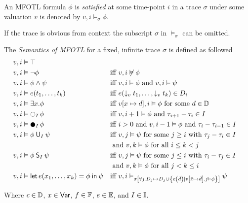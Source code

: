 \begin{definition}
    \label{def:mfotl-satisfaction}
    An MFOTL formula $\phi$ is \emph{satisfied} at some time-point $i$ in
    a trace $\sigma$ under
    some valuation $v$ is denoted by $v,i \vDash_\sigma \phi $.
\end{definition}
If the trace is obvious from context the subscript $\sigma$ in $\vDash_\sigma$ can be
omitted.
\begin{definition}
    \label{def:mfotl-semantics}
    The \emph{Semantics of MFOTL} for a fixed, infinite trace $\sigma$ is defined as followed
    \begin{align*}
        v, i &\vDash  \top \\
        v, i &\vDash  \neg \phi
            &&\text{iff } v, i \not\vDash  \phi \\
        v, i &\vDash  \phi \wedge \psi
            &&\text{iff } v, i \vDash  \phi \text{ and } v, i \vDash  \psi \\
        v, i &\vDash  e(t_1, \dots, t_k)
            &&\text{iff } e(\downarrow_v t_1, \dots, \downarrow_v t_k) \in D_i \\
        v, i &\vDash  \exists x. \phi
            &&\text{iff } v[x \mapsto d], i \vDash  \phi \text{ for some } d \in \Domain \\
        v, i &\vDash  \Next_I \phi
            &&\text{iff } v, i+1 \vDash  \phi \text{ and } \tau_{i+1} - \tau_i \in I \\
        v, i &\vDash  \Prev_I \phi
            &&\text{iff } i>0 \text{ and } v, i-1 \vDash  \phi
            \text{ and } \tau_i - \tau_{i-1} \in I \\
        v, i &\vDash  \phi \UUntil_I \psi
            &&\text{iff } v, j \vDash  \psi \text{ for some } j \geq i
            \text{ with } \tau_j - \tau_i \in I \\
            &&&
            \text{ and } v, k \vDash  \phi \text{ for all } i \leq k < j \\
        v, i &\vDash  \phi \Since_I \psi
            &&\text{iff } v, j \vDash  \psi \text{ for some } j \leq i
            \text{ with } \tau_i - \tau_j \in I \\
            &&&
            \text{ and } v, k \vDash  \phi \text{ for all } j < k \leq i \\
        v, i &\vDash  \LLet{e(x_1, \dots, x_k)}{\phi}{\psi}
            && \text{iff } v, i \vDash_{\sigma \left[ \forall j. D_j \mapsto D_j \cup \left\lbrace e\left(\bar{d}\right) \mid v\left[\bar{x} \mapsto \bar{d}\right], j \vDash \phi \right\rbrace \right]} \psi
    \end{align*}
    
    Where $c \in \mathbb{D}$,
    $x \in \mathsf{Var}$,
    $f \in \mathbb{F}$,
    $e \in \mathbb{E}$,
    and $I \in \mathbb{I}$.
    
\end{definition}

